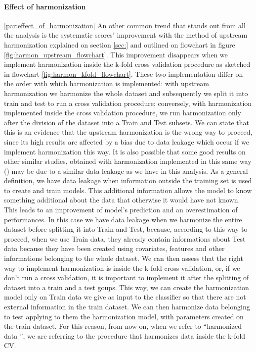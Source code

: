 \documentclass[11pt]{report}
\begin{document}
\paragraph{Effect of harmonization} \ref{par:effect_of_harmonization}
An other common trend that stands out from all the analysis is the systematic scores' improvement with the method of upstream harmonization explained on section \ref{sec:} and outlined on flowchart in figure \ref{fig:harmon_upstream_flowchart}.
This improvement disappears when we implement harmonization inside the k-fold cross validation procedure as sketched in flowchart \ref{fig:harmon_kfold_flowchart}.
These two implementation differ on the order with which harmonization is implemented: with upstream harmonization we harmonize the whole dataset and subsequently we split it into train and test to run a cross validation procedure; conversely, with harmonization implemented inside the cross validation procedure, we run harmonization only after the division of the dataset into a Train and Test subsets.
We can state that this is an evidence that the upstream harmonization is the wrong way to proceed, since its high results are affected by a bias due to data leakage which occur if we implement harmonization this way.
It is also possible that some good results on other similar studies, obtained with harmonization implemented in this same way (\cite{ingalhalikar-2021}) may be due to a similar data leakage as we have in this analysis.
As a general definition, we have data leakage when information outside the training set is used to create and train models. This additional information allows the model to know something additional about the data that otherwise it would have not known.
This leads to an improvement of model's prediction and an overestimation of performances.
In this case we have data leakage when we harmonize the entire dataset before splitting it into Train and Test, because, according to this way to proceed, when we use Train data, they already contain informations about Test data because they have been created using covariates, features and other informations belonging to the whole dataset.
We can then assess that the right way to implement harmonization is inside the k-fold cross validation, or, if we don't run a cross validation, it is important to implement it after the splitting of dataset into a train and a test goups. This way, we can create the harmonization model only on Train data we give as input to the classifier so that there are not external information in the train dataset.
We can then harmonize data belonging to test applying to them the harmonization model, with parameters created on the train dataset.
For this reason, from now on, when we refer to \textquotedblleft harmonized data \textquotedblright, we are referring to the procedure that harmonizes data inside the k-fold CV.
\end{document}
